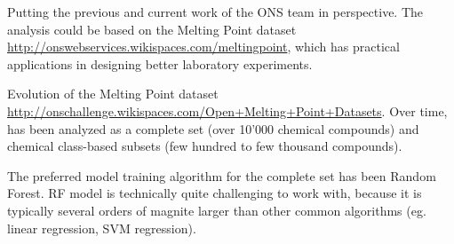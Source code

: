\documentclass[12pt,letterpaper]{article}
\begin{document}
Putting the previous and current work of the ONS team in perspective.
The analysis could be based on the Melting Point dataset \url{http://onswebservices.wikispaces.com/meltingpoint}, which has practical 
applications in designing better laboratory experiments.

Evolution of the Melting Point dataset \url{http://onschallenge.wikispaces.com/Open+Melting+Point+Datasets}. Over time, has been analyzed as a complete set 
(over 10'000 chemical compounds) and chemical class-based subsets (few
hundred to few thousand compounds).

The preferred model training algorithm for the complete set has been
Random Forest. RF model is technically quite challenging to work with,
because it is typically several orders of magnite larger than other
common algorithms (eg. linear regression, SVM regression).
\end{document}
